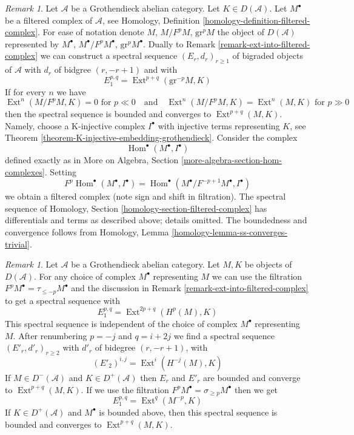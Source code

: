 \documentclass{stacks-project}
\theoremstyle{plain}
\theoremstyle{definition}
\theoremstyle{remark}
\newtheorem{remark}[subsection]{Remark}
\numberwithin{equation}{subsection}
\def\Hom{\mathop{\mathrm{Hom}}\nolimits}
\def\Ext{\mathop{\mathrm{Ext}}\nolimits}
\begin{document}
\begin{remark}
\label{remark-ext-from-filtered-complex}
Let $\mathcal{A}$ be a Grothendieck abelian category. Let
$K \in D(\mathcal{A})$. Let $M^\bullet$ be a filtered complex of
$\mathcal{A}$, see Homology, Definition
\ref{homology-definition-filtered-complex}.
For ease of notation denote $M$, $M/F^pM$, $\text{gr}^pM$ the
object of $D(\mathcal{A})$ represented by $M^\bullet$,
$M^\bullet/F^pM^\bullet$, $\text{gr}^pM^\bullet$.
Dually to Remark \ref{remark-ext-into-filtered-complex}
we can construct a spectral sequence $(E_r, d_r)_{r \geq 1}$
of bigraded objects of $\mathcal{A}$ with $d_r$ of bidgree
$(r, -r + 1)$ and
with
$$
E_1^{p, q} = \Ext^{p + q}(\text{gr}^{-p}M, K)
$$
If for every $n$ we have
$$
\Ext^n(M/F^pM, K) = 0 \text{ for } p \ll 0
\quad\text{and}\quad
\Ext^n(M/F^pM, K) = \Ext^n(M, K) \text{ for } p \gg 0
$$
then the spectral sequence is bounded and converges to $\Ext^{p + q}(M, K)$.
Namely, choose a K-injective complex $I^\bullet$ with injective terms
representing $K$, see Theorem \ref{theorem-K-injective-embedding-grothendieck}.
Consider the complex
$$
\Hom^\bullet(M^\bullet, I^\bullet)
$$
defined exactly as in
More on Algebra, Section \ref{more-algebra-section-hom-complexes}.
Setting
$$
F^p\Hom^\bullet(M^\bullet, I^\bullet) =
\Hom^\bullet(M^\bullet/F^{-p + 1}M^\bullet, I^\bullet)
$$
we obtain a filtered complex (note sign and shift in filtration).
The spectral sequence of
Homology, Section \ref{homology-section-filtered-complex}
has differentials and terms as described above; details omitted.
The boundedness and convergence follows from
Homology, Lemma \ref{homology-lemma-ss-converges-trivial}.
\end{remark}

\begin{remark}
\label{remark-spectral-sequences-ext-variant}
Let $\mathcal{A}$ be a Grothendieck abelian category.
Let $M, K$ be objects of $D(\mathcal{A})$.
For any choice of complex $M^\bullet$ representing $M$ we
can use the filtration $F^pM^\bullet = \tau_{\leq -p}M^\bullet$
and the discussion in Remark \ref{remark-ext-into-filtered-complex}
to get a spectral sequence with
$$
E_1^{p, q} = \Ext^{2p + q}(H^p(M), K)
$$
This spectral sequence is independent of the choice of complex $M^\bullet$
representing $M$. After renumbering $p = -j$ and $q = i + 2j$ we find a
spectral sequence $(E'_r, d'_r)_{r \geq 2}$ with $d'_r$ of bidegree
$(r, -r + 1)$, with
$$
(E'_2)^{i, j} = \Ext^i(H^{-j}(M), K)
$$
If $M \in D^-(\mathcal{A})$ and $K \in D^+(\mathcal{A})$
then $E_r$ and $E'_r$ are bounded and converge to $\Ext^{p + q}(M, K)$.
If we use the filtration $F^pM^\bullet = \sigma_{\geq p}M^\bullet$
then we get
$$
E_1^{p, q} = \Ext^q(M^{-p}, K)
$$
If $K \in D^+(\mathcal{A})$ and $M^\bullet$ is bounded above, then
this spectral sequence is bounded and converges to $\Ext^{p + q}(M, K)$.
\end{remark}
\end{document}
